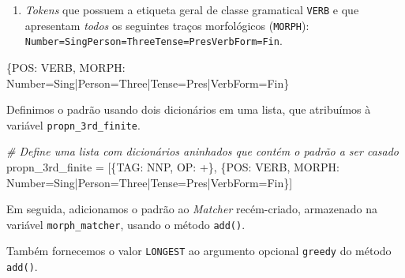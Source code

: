 \documentclass[
  brazilian,
]{article}
\newenvironment{Shaded}{}{}
\newcommand{\CommentTok}[1]{\textcolor[rgb]{0.38,0.63,0.69}{\textit{#1}}}
\newcommand{\NormalTok}[1]{#1}
\newcommand{\OperatorTok}[1]{\textcolor[rgb]{0.40,0.40,0.40}{#1}}
\newcommand{\StringTok}[1]{\textcolor[rgb]{0.25,0.44,0.63}{#1}}
\providecommand{\tightlist}{%
  \setlength{\itemsep}{0pt}\setlength{\parskip}{0pt}}
\begin{document}
\begin{enumerate}
\def\labelenumi{\arabic{enumi}.}
\setcounter{enumi}{1}
\tightlist
\item
  \emph{Tokens} que possuem a etiqueta geral de classe gramatical
  \texttt{VERB} e que apresentam \emph{todos} os seguintes traços
  morfológicos (\texttt{MORPH}):
  \texttt{Number=Sing\textbar{}Person=Three\textbar{}Tense=Pres\textbar{}VerbForm=Fin}.
\end{enumerate}

\begin{Shaded}
\begin{Highlighting}[]
\NormalTok{\{}\StringTok{\textquotesingle{}POS\textquotesingle{}}\NormalTok{: }\StringTok{\textquotesingle{}VERB\textquotesingle{}}\NormalTok{, }\StringTok{\textquotesingle{}MORPH\textquotesingle{}}\NormalTok{: }\StringTok{\textquotesingle{}Number=Sing|Person=Three|Tense=Pres|VerbForm=Fin\textquotesingle{}}\NormalTok{\}}
\end{Highlighting}
\end{Shaded}

Definimos o padrão usando dois dicionários em uma lista, que atribuímos
à variável \texttt{propn\_3rd\_finite}.

\begin{Shaded}
\begin{Highlighting}[]
\CommentTok{\# Define uma lista com dicionários aninhados que contém o padrão a ser casado}
\NormalTok{propn\_3rd\_finite }\OperatorTok{=}\NormalTok{ [\{}\StringTok{\textquotesingle{}TAG\textquotesingle{}}\NormalTok{: }\StringTok{\textquotesingle{}NNP\textquotesingle{}}\NormalTok{, }\StringTok{\textquotesingle{}OP\textquotesingle{}}\NormalTok{: }\StringTok{\textquotesingle{}+\textquotesingle{}}\NormalTok{\},}
\NormalTok{                    \{}\StringTok{\textquotesingle{}POS\textquotesingle{}}\NormalTok{: }\StringTok{\textquotesingle{}VERB\textquotesingle{}}\NormalTok{, }\StringTok{\textquotesingle{}MORPH\textquotesingle{}}\NormalTok{: }\StringTok{\textquotesingle{}Number=Sing|Person=Three|Tense=Pres|VerbForm=Fin\textquotesingle{}}\NormalTok{\}]}
\end{Highlighting}
\end{Shaded}

Em seguida, adicionamos o padrão ao \emph{Matcher} recém-criado,
armazenado na variável \texttt{morph\_matcher}, usando o método
\texttt{add()}.

Também fornecemos o valor \texttt{LONGEST} ao argumento opcional
\texttt{greedy} do método \texttt{add()}.
\end{document}

